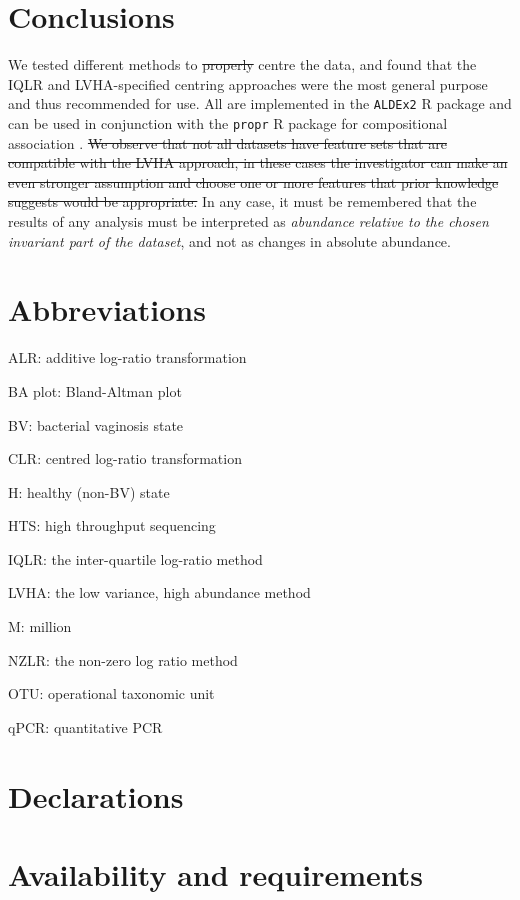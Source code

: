 \documentclass[graybox]{svmult}
\providecommand{\DIFdel}[1]{{\protect\color{red}\sout{#1}}}                      %
\providecommand{\DIFaddend}{} %
\providecommand{\DIFdelbegin}{} %
\providecommand{\DIFdelend}{} %
\begin{document}
 
\DIFaddend \section*{Conclusions}
We tested  different methods to  \DIFdelbegin \DIFdel{properly }\DIFdelend centre the data, and found that the IQLR and LVHA-specified centring approaches were the most general purpose and thus recommended for use. All are implemented in the \texttt{ALDEx2} R package \cite{fernandes:2014} and can be used in conjunction with the \texttt{propr} R package for compositional association \cite{Quinn:2017}.   \DIFdelbegin \DIFdel{We observe that not all datasets have feature sets that are compatible with the LVHA approach, in these cases the investigator can make an even stronger assumption and choose one or more features that prior knowledge suggests would be appropriate.  }\DIFdelend In any case, it must be remembered that the results of any analysis must be interpreted as \textit{abundance relative to the chosen invariant part of the dataset}, and not as changes in absolute abundance.

\section*{Abbreviations}

\noindent ALR: additive log-ratio transformation

\noindent BA plot: Bland-Altman plot

\noindent BV: bacterial vaginosis state

\noindent CLR: centred log-ratio transformation

\noindent H: healthy (non-BV) state

\noindent HTS: high throughput sequencing

\noindent IQLR: the inter-quartile log-ratio method

\noindent LVHA: the low variance, high abundance method

\noindent M: million

\noindent NZLR: the non-zero log ratio method

\noindent OTU: operational taxonomic unit

\noindent qPCR: quantitative PCR

\section*{Declarations} 

\section*{Availability and requirements}
\end{document}
